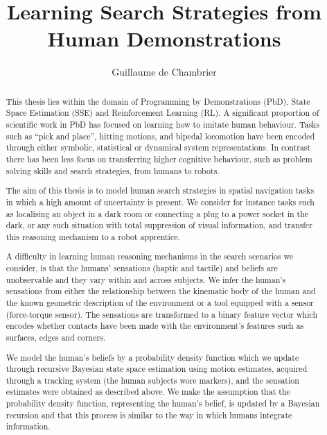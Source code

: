 \documentclass[a4paper,10pt]{article}
\title{Learning Search Strategies from Human Demonstrations}
\author{Guillaume de Chambrier}
\begin{document}
\maketitle

\begin{abstract}
 
This thesis lies within the domain of Programming by Demonstrations (PbD), State Space Estimation (SSE) and Reinforcement Learning (RL). 
A significant proportion of scientific work in PbD has focused on learning how to imitate human behaviour. Tasks such as ``pick and place'', 
hitting motions, and bipedal locomotion have been encoded through either symbolic, statistical or dynamical system representations. 
In contrast there has been less focus on transferring higher cognitive behaviour, such as problem solving skills and search strategies,
from humans to robots. 

The aim of this thesis is to model human search strategies in spatial navigation tasks in which a high amount of uncertainty is present.
We consider for instance tasks such as localising  an object in a dark room or connecting a plug to a power socket in the dark, 
or any such situation with total suppression of visual information, and transfer this reasoning mechanism to a robot apprentice. 

A difficulty in learning human reasoning mechanisms in the search scenarios we consider, is that the humans'  
sensations (haptic and tactile) and beliefs are unobservable and they vary within and across subjects. 
We infer the human's sensations from either the relationship between the kinematic body of the human and the known geometric description of 
the environment or a tool equipped with a sensor (force-torque sensor). The sensations are transformed 
to a binary feature vector which encodes whether contacts have been made with the environment's features such as surfaces, edges and corners. 

We model the human's beliefs by a probability density function which we update through recursive Bayesian 
state space estimation using motion estimates, acquired through a tracking system (the human subjects wore markers), 
and the sensation estimates were obtained as described above. We make the assumption that the probability 
density function, representing the human's belief, is updated by a Bayesian recursion and that this process is similar to the way in 
which humans integrate information.


\end{abstract}
\end{document}
